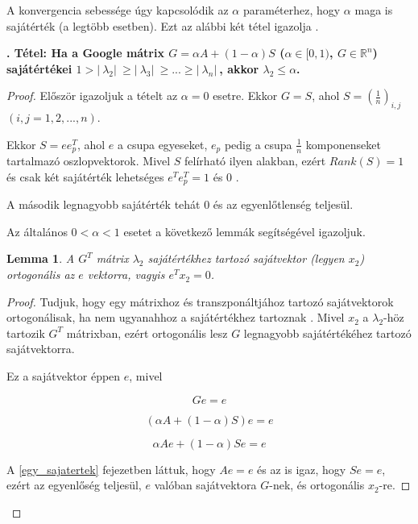 \documentclass[12pt,a4paper]{article}
\newcounter{tszam}
\newenvironment{tetel}[1]
{{\medskip}\noindent \stepcounter{tszam}
{\bfseries{\thetszam. Tétel: #1\\[1ex]}}}{\bigskip }
\newtheorem{lemma}{Lemma}
\begin{document}
A konvergencia sebessége úgy kapcsolódik az $\alpha$ paraméterhez, hogy $\alpha$ maga is sajátérték (a legtöbb esetben). Ezt az alábbi két tétel igazolja \cite{secondeigenvalue}. 

\vspace{0.1cm}
\begin{tetel}{Ha a Google mátrix $G = \alpha A + (1-\alpha)S$ ($\alpha \in [0,1)$, $G \in \mathbb{R}^n$) sajátértékei $ 1 > |\ \lambda_2 |\ \geq |\ \lambda_3 |\ \geq ... \geq |\ \lambda_n |\ $, akkor $\lambda_2 \leq \alpha$. }
\end{tetel}
\vspace{-1cm}
\begin{proof}
	
	Először igazoljuk a tételt az $\alpha = 0$ esetre. Ekkor $G = S$, ahol $S = (\frac{1}{n})_{i,j}$ $(i,j = 1,2,...,n)$.
	
	Ekkor $S = e e_p^T$, ahol $e$ a csupa egyeseket, $e_p$ pedig a csupa $\frac{1}{n}$ komponenseket tartalmazó oszlopvektorok. Mivel $S$ felírható ilyen alakban, ezért $Rank(S) = 1$ és csak két sajátérték lehetséges $e^T e_p^T = 1$ és 0 \cite{rankonematrix}.   
	
	A második legnagyobb sajátérték tehát 0 és az egyenlőtlenség teljesül.
	
	\vspace{0.1cm}
	Az általános $0 < \alpha < 1$ esetet a következő lemmák segítségével igazoljuk. 
	
	\begin{lemma}\label{orthogonal_lemma}
	 	A $G^T$ mátrix $\lambda_2$ sajátértékhez tartozó sajátvektor (legyen $x_2$) ortogonális az $e$ vektorra, vagyis $e^T x_2 = 0$.
	\end{lemma}
	\begin{proof}
		Tudjuk, hogy egy mátrixhoz és transzponáltjához tartozó sajátvektorok ortogonálisak, ha nem ugyanahhoz a sajátértékhez tartoznak \cite{orthogonal_eigenvectors}. Mivel $x_2$ a $\lambda_2$-höz tartozik $G^T$ mátrixban, ezért ortogonális lesz $G$ legnagyobb sajátértékéhez tartozó sajátvektorra. 
		
		Ez a sajátvektor éppen $e$, mivel
		
		\[ G e = e \]
		
		\[  ( \alpha A + (1-\alpha) S ) e = e  \]
		
		\[  \alpha A e + (1-\alpha) S e = e \]
		
		A \ref{egy_sajatertek} fejezetben láttuk, hogy $A e = e$ és az is igaz, hogy $S e = e$, ezért az egyenlőség teljesül, $e$ valóban sajátvektora $G$-nek, és ortogonális $x_2$-re.	
		\phantom\qedhere
	\end{proof}
	

\end{proof}
\end{document}
